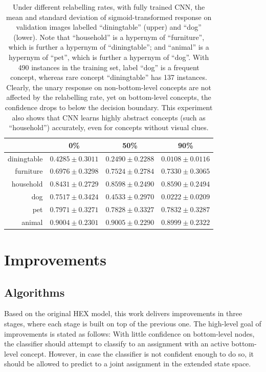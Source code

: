\documentclass[11pt,a4paper]{article}
\begin{document}
\begin{table}[htbp]
\centering
\begin{tabular}{r|c|c|c}
 & 0\% & 50\% & 90\%\\
\hline
diningtable & $0.4285\pm0.3011$ & $0.2490\pm0.2288$ & $0.0108\pm0.0116$\\
furniture   & $0.6976\pm0.3298$ & $0.7524\pm0.2784$ & $0.7330\pm0.3065$\\
household   & $0.8431\pm0.2729$ & $0.8598\pm0.2490$ & $0.8590\pm0.2494$\\
\hline
dog         & $0.7517\pm0.3424$ & $0.4533\pm0.2970$ & $0.0222\pm0.0209$\\
pet         & $0.7971\pm0.3271$ & $0.7828\pm0.3327$ & $0.7832\pm0.3287$\\
animal      & $0.9004\pm0.2301$ & $0.9005\pm0.2290$ & $0.8999\pm0.2322$
\end{tabular}
\caption{Under different relabelling rates, with fully trained CNN, the mean and standard deviation of sigmoid-transformed response on validation images labelled ``diningtable'' (upper) and ``dog'' (lower). Note that ``household'' is a hypernym of ``furniture'', which is further a hypernym of ``diningtable''; and ``animal'' is a hypernym of ``pet'', which is further a hypernym of ``dog''. With 490 instances in the training set, label ``dog'' is a frequent concept, whereas rare concept ``diningtable'' has 137 instances. Clearly, the unary response on non-bottom-level concepts are not affected by the relabelling rate, yet on bottom-level concepts, the confidence drops to below the decision boundary.  This experiment also shows that CNN learns highly abstract concepts (such as ``household'') accurately, even for concepts without visual clues.}
\label{tab:resp}
\end{table}

\clearpage
\section{Improvements}
\subsection{Algorithms}

Based on the original HEX model, this work delivers improvements in three stages, where each stage is built on top of the previous one. The high-level goal of improvements is stated as follows: With little confidence on bottom-level nodes, the classifier should attempt to classify to an assignment with an active bottom-level concept. However, in case the classifier is not confident enough to do so, it should be allowed to predict to a joint assignment in the extended state space.
\end{document}

